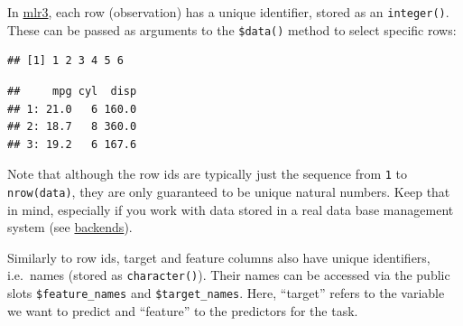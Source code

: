 \documentclass[
]{scrbook}
\newenvironment{Shaded}{\begin{snugshade}}{\end{snugshade}}
\newcommand{\AttributeTok}[1]{\textcolor[rgb]{0.77,0.63,0.00}{#1}}
\newcommand{\CommentTok}[1]{\textcolor[rgb]{0.56,0.35,0.01}{\textit{#1}}}
\newcommand{\DecValTok}[1]{\textcolor[rgb]{0.00,0.00,0.81}{#1}}
\newcommand{\FunctionTok}[1]{\textcolor[rgb]{0.00,0.00,0.00}{#1}}
\newcommand{\NormalTok}[1]{#1}
\newcommand{\SpecialCharTok}[1]{\textcolor[rgb]{0.00,0.00,0.00}{#1}}
\renewenvironment{Shaded} {\begin{snugshade}\small} {\end{snugshade}}
\begin{document}
In \href{https://mlr3.mlr-org.com}{mlr3}, each row (observation) has a unique identifier, stored as an \texttt{integer()}.
These can be passed as arguments to the \texttt{\$data()} method to select specific rows:

\begin{Shaded}
\end{Shaded}

\begin{verbatim}
## [1] 1 2 3 4 5 6
\end{verbatim}

\begin{Shaded}
\end{Shaded}

\begin{verbatim}
##     mpg cyl  disp
## 1: 21.0   6 160.0
## 2: 18.7   8 360.0
## 3: 19.2   6 167.6
\end{verbatim}

Note that although the row ids are typically just the sequence from \texttt{1} to \texttt{nrow(data)}, they are only guaranteed to be unique natural numbers.
Keep that in mind, especially if you work with data stored in a real data base management system (see \protect\hyperlink{backends}{backends}).

Similarly to row ids, target and feature columns also have unique identifiers, i.e.~names (stored as \texttt{character()}).
Their names can be accessed via the public slots \texttt{\$feature\_names} and \texttt{\$target\_names}.
Here, ``target'' refers to the variable we want to predict and ``feature'' to the predictors for the task.

\begin{Shaded}
\end{Shaded}
\end{document}
